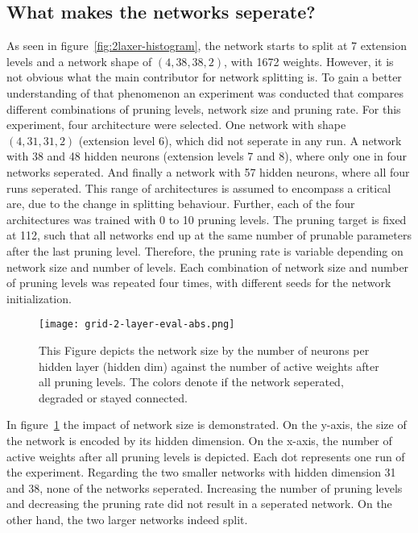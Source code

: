 \subsection{What makes the networks seperate?}
As seen in figure~\ref{fig:2laxer-histogram}, the network starts to split at 7 extension levels and a network shape of $(4,38,38,2)$, with 1672 weights.
However, it is not obvious what the main contributor for network splitting is.
To gain a better understanding of that phenomenon an experiment was conducted that compares different combinations of pruning levels, network size and pruning rate.
For this experiment, four architecture were selected.
One network with shape $(4,31,31,2)$ (extension level 6), which did not seperate in any run.
A network with 38 and 48 hidden neurons (extension levels 7 and 8), where only one in four networks seperated.
And finally a network with 57 hidden neurons, where all four runs seperated.
This range of architectures is assumed to encompass a critical are, due to the change in splitting behaviour.
Further, each of the four architectures was trained with 0 to 10 pruning levels.
The pruning target is fixed at 112, such that all networks end up at the same number of prunable parameters after the last pruning level.
Therefore, the pruning rate is variable depending on network size and number of levels.
Each combination of network size and number of pruning levels was repeated four times, with different seeds for the network initialization.

\begin{figure}[ht]
    \centering
    \texttt{[image: grid-2-layer-eval-abs.png]}
    \caption{This Figure depicts the network size by the number of neurons per hidden layer (hidden dim) against the number of active weights after all pruning levels.
    The colors denote if the network seperated, degraded or stayed connected.}\label{fig:grid-1}
\end{figure}

In figure~\ref{fig:grid-1} the impact of network size is demonstrated.
On the y-axis, the size of the network is encoded by its hidden dimension.
On the x-axis, the number of active weights after all pruning levels is depicted.
Each dot represents one run of the experiment.
Regarding the two smaller networks with hidden dimension 31 and 38, none of the networks seperated. 
Increasing the number of pruning levels and decreasing the pruning rate did not result in a seperated network.
On the other hand, the two larger networks indeed split.

